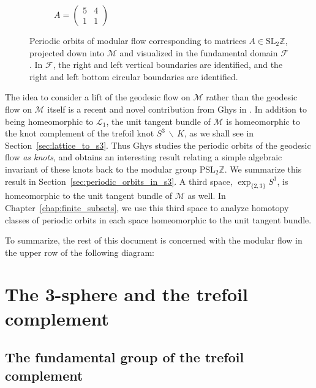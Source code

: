 \documentclass[12pt,twoside]{reedthesis}
\theoremstyle{definition}
\newcommand{\Z}{\mathbb{Z}}
\newcommand{\LS}{\mathcal{L}}
\newcommand{\SLZ}{\mathrm{SL}_2{\Z}}
\newcommand{\PSLZ}{\mathrm{PSL}_2{\Z}}
\newcommand{\wo}{\, \backslash \,}
\begin{document}
\begin{figure}[t]
\begin{subfigure}[t]{0.4\textwidth}
    \caption*{$A = \begin{pmatrix}5 & 4 \\ 1 & 1\end{pmatrix}$}
  \end{subfigure}
  \caption{Periodic orbits of modular flow corresponding to matrices $A \in \SLZ$, projected down into $\mathcal{M}$ and visualized in the fundamental domain $\mathcal{F}$. In $\mathcal{F}$, the right and left vertical boundaries are identified, and the right and left bottom circular boundaries are identified.}
  \label{fig:modular_surface_orbits}
\end{figure}

The idea to consider a lift of the geodesic flow on $\mathcal{M}$ rather than the geodesic flow on $\mathcal{M}$ itself is a recent and novel contribution from Ghys in \cite{ghys2007}.
In addition to being homeomorphic to $\LS_1$, the unit tangent bundle of $\mathcal{M}$ is homeomorphic to the knot complement of the trefoil knot $S^3 \wo K$, as we shall see in Section~\ref{sec:lattice_to_s3}.
Thus Ghys studies the periodic orbits of the geodesic flow \emph{as knots}, and obtains an interesting result relating a simple algebraic invariant of these knots back to the modular group $\PSLZ$.
We summarize this result in Section~\ref{sec:periodic_orbits_in_s3}.
A third space, $\exp_{\{2,3\}} S^1$, is homeomorphic to the unit tangent bundle of $\mathcal{M}$ as well.
In Chapter~\ref{chap:finite_subsets}, we use this third space to analyze homotopy classes of periodic orbits in each space homeomorphic to the unit tangent bundle.

To summarize, the rest of this document is concerned with the modular flow in the upper row of the following diagram:

\begin{center}
\end{center}

\chapter{The 3-sphere and the trefoil complement}\label{sec:three_sphere}

\section{The fundamental group of the trefoil complement}
\end{document}
